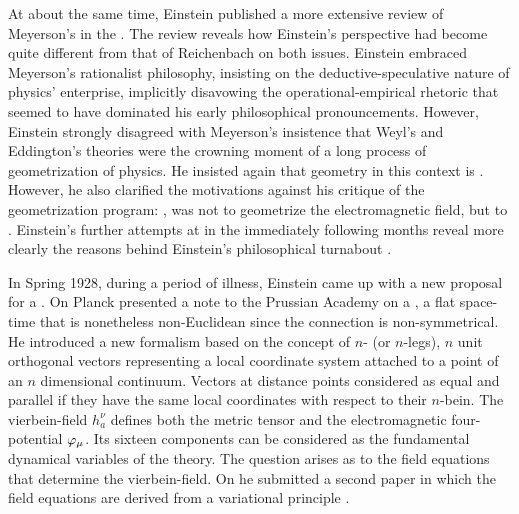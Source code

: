 \documentclass[final]{article}
\renewcommand{\me}{;~m.e.{}}
\newcommand{\nbein}{$n$-bein\xspace}
\newcommand{\vbein}{vierbein\xspace}
\newcommand{\hbein}{\ensuremath{h_{a}^{\nu}}\xspace}
\begin{document}
At about the same time, Einstein published a more extensive review of Meyerson's  \citep{Meyerson1925} in the . The review reveals how Einstein's perspective had become quite different from that of Reichenbach on both issues. Einstein embraced Meyerson's rationalist philosophy, insisting on the deductive-speculative nature of physics' enterprise, implicitly disavowing the operational-empirical rhetoric that seemed to have dominated his early philosophical pronouncements. However, Einstein strongly disagreed with Meyerson's insistence that Weyl's and Eddington's theories were the crowning moment of a long process of geometrization of physics. He insisted again that geometry in this context is  \citep[165\me]{Einstein1928b}. However, he also clarified the motivations against his critique of the geometrization program: , was not to geometrize the electromagnetic field, but to  \citep[165\me]{Einstein1928b}. Einstein's further attempts at \uft in the immediately following months reveal more clearly the reasons behind Einstein's philosophical turnabout \citep{Giovanelli2018}.

In Spring 1928, during a period of illness, Einstein came up with a new proposal for a \uft. On  Planck presented a note to the Prussian Academy on a  \citep{Einstein19281}, a flat space-time that is nonetheless non-Euclidean since the connection \Gtmn is non-symmetrical. He introduced a new formalism based on the concept of $n$- (or $n$-legs), $n$ unit orthogonal vectors representing a local coordinate system attached to a point of an $n$ dimensional continuum. Vectors at distance points considered as equal and parallel if they have the same local coordinates with respect to their \nbein. The \vbein-field \hbein defines both the metric tensor \gmn and the electromagnetic four-potential $\varphi_{\mu}$. Its sixteen components can be considered as the fundamental dynamical variables of the theory. The question arises as to the field equations that determine the \vbein-field. On  he submitted a second paper in which the field equations are derived from a variational principle \citep{Einstein19282}.
\end{document}

